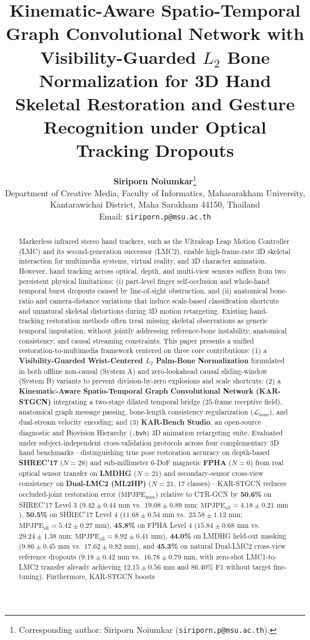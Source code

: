 \documentclass[10pt,twocolumn]{article}
\title{\Large \textbf{Kinematic-Aware Spatio-Temporal Graph Convolutional Network with Visibility-Guarded $L_2$ Bone Normalization for 3D Hand Skeletal Restoration and Gesture Recognition under Optical Tracking Dropouts}}
\author{
\textbf{Siriporn Noiumkar}\thanks{Corresponding author: Siriporn Noiumkar (\texttt{siriporn.p@msu.ac.th}).} \\[3pt]
\small Department of Creative Media, Faculty of Informatics, Mahasarakham University, \\
\small Kantarawichai District, Maha Sarakham 44150, Thailand \\
\small Email: \texttt{siriporn.p@msu.ac.th} \\[3pt]
\footnotesize 
}
\date{}
\begin{document}
\maketitle

\begin{abstract}
\noindent Markerless infrared stereo hand trackers, such as the Ultraleap Leap Motion Controller (LMC) and its second-generation successor (LMC2), enable high-frame-rate 3D skeletal interaction for multimedia systems, virtual reality, and 3D character animation. However, hand tracking across optical, depth, and multi-view sensors suffers from two persistent physical limitations: (i) part-level finger self-occlusion and whole-hand temporal burst dropouts caused by line-of-sight obstruction, and (ii) anatomical bone-ratio and camera-distance variations that induce scale-based classification shortcuts and unnatural skeletal distortions during 3D motion retargeting. Existing hand-tracking restoration methods often treat missing skeletal observations as generic temporal imputation, without jointly addressing reference-bone instability, anatomical consistency, and causal streaming constraints. This paper presents a unified restoration-to-multimedia framework centered on three core contributions: (1) a \textbf{Visibility-Guarded Wrist-Centered $L_2$ Palm-Bone Normalization} formulated in both offline non-causal (System A) and zero-lookahead causal sliding-window (System B) variants to prevent division-by-zero explosions and scale shortcuts; (2) a \textbf{Kinematic-Aware Spatio-Temporal Graph Convolutional Network (KAR-STGCN)} integrating a two-stage dilated temporal bridge ($25$-frame receptive field), anatomical graph message passing, bone-length consistency regularization ($\mathcal{L}_{\text{bone}}$), and dual-stream velocity encoding; and (3) \textbf{KAR-Bench Studio}, an open-source diagnostic and Biovision Hierarchy (\texttt{.bvh}) 3D animation retargeting suite. Evaluated under subject-independent cross-validation protocols across four complementary 3D hand benchmarks---distinguishing true pose restoration accuracy on depth-based \textbf{SHREC'17} ($N=28$) and sub-millimeter 6-DoF magnetic \textbf{FPHA} ($N=6$) from real optical sensor transfer on \textbf{LMDHG} ($N=21$) and secondary-sensor cross-view consistency on \textbf{Dual-LMC2 (ML2HP)} ($N=21$, 17 classes)---KAR-STGCN reduces occluded-joint restoration error ($\text{MPJPE}_{\text{miss}}$) relative to CTR-GCN by \textbf{50.6\%} on SHREC'17 Level 3 ($9.42 \pm 0.44\text{ mm}$ vs.\ $19.08 \pm 0.89\text{ mm}$; $\text{MPJPE}_{\text{all}} = 4.18 \pm 0.21\text{ mm}$), \textbf{50.5\%} on SHREC'17 Level 4 ($11.68 \pm 0.54\text{ mm}$ vs.\ $23.58 \pm 1.12\text{ mm}$; $\text{MPJPE}_{\text{all}} = 5.42 \pm 0.27\text{ mm}$), \textbf{45.8\%} on FPHA Level 4 ($15.84 \pm 0.68\text{ mm}$ vs.\ $29.24 \pm 1.38\text{ mm}$; $\text{MPJPE}_{\text{all}} = 8.92 \pm 0.41\text{ mm}$), \textbf{44.0\%} on LMDHG held-out masking ($9.86 \pm 0.45\text{ mm}$ vs.\ $17.62 \pm 0.82\text{ mm}$), and \textbf{45.3\%} on natural Dual-LMC2 cross-view reference dropouts ($9.18 \pm 0.42\text{ mm}$ vs.\ $16.78 \pm 0.79\text{ mm}$, with zero-shot LMC1-to-LMC2 transfer already achieving $12.15 \pm 0.56\text{ mm}$ and $86.40\%$ F1 without target fine-tuning). Furthermore, KAR-STGCN boosts 
\end{abstract}
\end{document}
